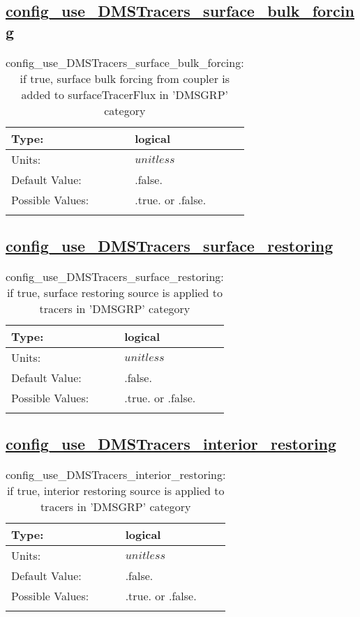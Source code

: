 \subsection[config\_use\_DMSTracers\_surface\_bulk\_forcing]{\hyperref[sec:nm_tab_tracer_forcing_DMSTracers]{config\_use\_DMSTracers\_surface\_bulk\_forcing}}
\label{subsec:nm_sec_config_use_DMSTracers_surface_bulk_forcing}
\begin{center}
\begin{longtable}{| p{2.0in} || p{4.0in} |}
    \hline
    Type: & logical \\
    \hline
    Units: & $unitless$ \\
    \hline
    Default Value: & .false. \\
    \hline
    Possible Values: & .true. or .false. \\
    \hline
    \caption{config\_use\_DMSTracers\_surface\_bulk\_forcing: if true, surface bulk forcing from coupler is added to surfaceTracerFlux in 'DMSGRP' category}
\end{longtable}
\end{center}
\subsection[config\_use\_DMSTracers\_surface\_restoring]{\hyperref[sec:nm_tab_tracer_forcing_DMSTracers]{config\_use\_DMSTracers\_surface\_restoring}}
\label{subsec:nm_sec_config_use_DMSTracers_surface_restoring}
\begin{center}
\begin{longtable}{| p{2.0in} || p{4.0in} |}
    \hline
    Type: & logical \\
    \hline
    Units: & $unitless$ \\
    \hline
    Default Value: & .false. \\
    \hline
    Possible Values: & .true. or .false. \\
    \hline
    \caption{config\_use\_DMSTracers\_surface\_restoring: if true, surface restoring source is applied to tracers in 'DMSGRP' category}
\end{longtable}
\end{center}
\subsection[config\_use\_DMSTracers\_interior\_restoring]{\hyperref[sec:nm_tab_tracer_forcing_DMSTracers]{config\_use\_DMSTracers\_interior\_restoring}}
\label{subsec:nm_sec_config_use_DMSTracers_interior_restoring}
\begin{center}
\begin{longtable}{| p{2.0in} || p{4.0in} |}
    \hline
    Type: & logical \\
    \hline
    Units: & $unitless$ \\
    \hline
    Default Value: & .false. \\
    \hline
    Possible Values: & .true. or .false. \\
    \hline
    \caption{config\_use\_DMSTracers\_interior\_restoring: if true, interior restoring source is applied to tracers in 'DMSGRP' category}
\end{longtable}
\end{center}
